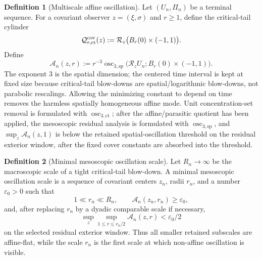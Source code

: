 \documentclass[11pt]{amsart}
\numberwithin{equation}{section}
\theoremstyle{plain}
\theoremstyle{definition}
\newtheorem{definition}[definition]{Definition}
\theoremstyle{remark}
\newcommand{\calR}{\mathcal R}
\newcommand{\oscsp}{\operatorname{osc}_{3,\mathrm{sp}}}
\newcommand{\actthree}{\operatorname{osc}_{3,\mathrm{ct}}}
\begin{document}
\begin{definition}[Multiscale affine oscillation]
\label{def:multiscale-affine-oscillation}
Let \((U_n,\Pi_n)\) be a terminal sequence.  For a covariant observer
\(z=(\xi,\sigma)\) and \(r\ge1\), define the critical-tail cylinder
\[
   \mathcal Q_{r,\mathrm{ct}}^{\rm cov}(z)
   :=
   \calR_z\bigl(B_r(0)\times(-1,1)\bigr).
\]
Define
\[
   \mathcal A_n(z,r)
   :=
   r^{-3}
   \oscsp\bigl(\calR_zU_n;B_r(0)\times(-1,1)\bigr).
\]
The exponent \(3\) is the spatial dimension; the centered time interval is kept
at fixed size because critical-tail blow-downs are spatial/logarithmic
blow-downs, not parabolic rescalings.  Allowing the minimizing constant to
depend on time removes the harmless spatially homogeneous affine mode.  Unit
concentration-set removal is formulated with \(\actthree\); after the
affine/parasitic quotient has been applied, the mesoscopic residual analysis is
formulated with \(\oscsp\), and \(\sup_z\mathcal A_n(z,1)\) is below the retained
spatial-oscillation threshold on the residual exterior window, after the fixed
cover constants are absorbed into the threshold.
\end{definition}

\begin{definition}[Minimal mesoscopic oscillation scale]
\label{def:first-bad-mesoscopic-scale}
Let \(R_n\to\infty\) be the macroscopic scale of a tight critical-tail
blow-down.  A minimal mesoscopic oscillation scale is a sequence of covariant centers
\(z_n\), radii \(r_n\), and a number \(\varepsilon_0>0\) such that
\[
   1\ll r_n\ll R_n,
   \qquad
   \mathcal A_n(z_n,r_n)\ge\varepsilon_0,
\]
and, after replacing \(r_n\) by a dyadic comparable scale if necessary,
\[
   \sup_{z}\sup_{1\le r\le r_n/2}\mathcal A_n(z,r)
   <\varepsilon_0/2
\]
on the selected residual exterior window.  Thus all smaller retained
subscales are affine-flat, while the scale \(r_n\) is the first scale at which
non-affine oscillation is visible.
\end{definition}
\end{document}
